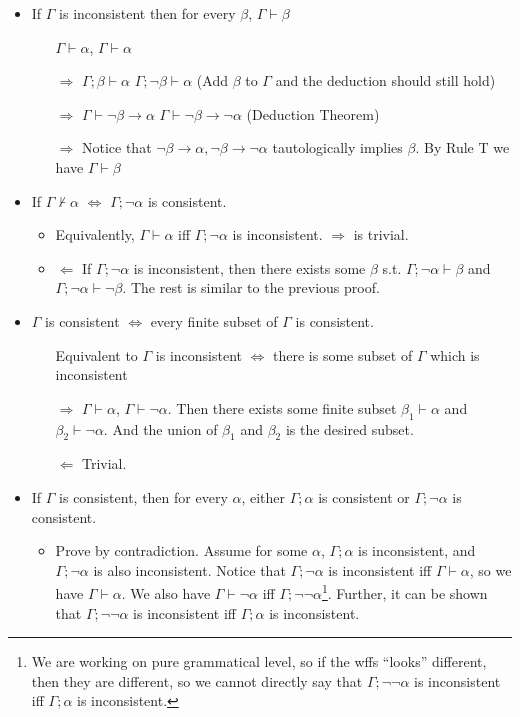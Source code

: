 \begin{itemize}
    \item If $\Gamma$ is inconsistent then for every $\beta$, $\Gamma\vdash\beta$
    \begin{itemize}
        \item[] $\Gamma\vdash\alpha$, $\Gamma\vdash\alpha$
        \item[$\Rightarrow$] $\Gamma;\beta\vdash\alpha$ $\Gamma;\neg\beta\vdash\alpha$ (Add $\beta$ to $\Gamma$ and the deduction should still hold)
        \item[$\Rightarrow$] $\Gamma\vdash\neg\beta\to\alpha$ $\Gamma\vdash\neg\beta\to\neg\alpha$ (Deduction Theorem)
        \item[$\Rightarrow$] Notice that $\neg\beta\to\alpha, \neg\beta\to\neg\alpha$ tautologically implies $\beta$. By Rule T we have $\Gamma\vdash\beta$ 
    \end{itemize}
    \item If $\Gamma\nvdash\alpha$ $\iff$ $\Gamma;\neg\alpha$ is consistent.
    \begin{itemize}
        \item Equivalently, $\Gamma\vdash\alpha$ iff $\Gamma;\neg\alpha$ is inconsistent. $\Rightarrow$ is trivial.
        \item $\Leftarrow$ If $\Gamma;\neg\alpha$ is inconsistent, then there exists some $\beta$ s.t. $\Gamma;\neg\alpha\vdash\beta$ and $\Gamma;\neg\alpha\vdash\neg\beta$. The rest is similar to the previous proof.
    \end{itemize}
    \item $\Gamma$ is consistent $\iff$ every finite subset of $\Gamma$ is consistent.
    \begin{itemize}
        \item[] Equivalent to $\Gamma$ is inconsistent $\iff$ there is some subset of $\Gamma$ which is inconsistent
        \item[$\Rightarrow$] $\Gamma\vdash\alpha$, $\Gamma\vdash\neg\alpha$. Then there exists some finite subset $\beta_1\vdash\alpha$ and $\beta_2\vdash\neg\alpha$. And the union of $\beta_1$ and $\beta_2$ is the desired subset.
        \item[$\Leftarrow$] Trivial. 
    \end{itemize}
    \item If $\Gamma$ is consistent, then for every $\alpha$, either $\Gamma;\alpha$ is consistent or $\Gamma;\neg\alpha$ is consistent.
    \begin{itemize}
        \item Prove by contradiction. Assume for some $\alpha$, $\Gamma;\alpha$ is inconsistent, and $\Gamma;\neg\alpha$ is also inconsistent. Notice that $\Gamma;\neg\alpha$ is inconsistent iff $\Gamma\vdash\alpha$, so we have $\Gamma\vdash\alpha$. We also have $\Gamma\vdash\neg\alpha$ iff $\Gamma;\neg\neg\alpha$\footnote{We are working on pure grammatical level, so if the wffs ``looks'' different, then they are different, so we cannot directly say that $\Gamma;\neg\neg\alpha$ is inconsistent iff $\Gamma;\alpha$ is inconsistent.}. Further, it can be shown that $\Gamma;\neg\neg\alpha$ is inconsistent iff $\Gamma;\alpha$ is inconsistent.

\end{itemize}
\end{itemize}
